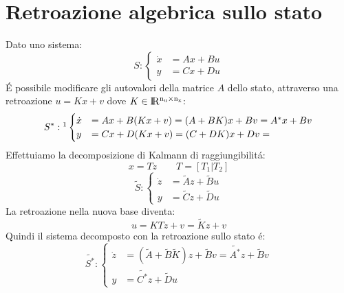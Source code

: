 \documentclass[../main.tex]{subfiles}
\begin{document}
	\section{Retroazione algebrica sullo stato}
		Dato uno sistema:
		\[
			S: 
			\begin{cases}
				\dot x &= Ax + Bu\\
				y &= Cx + Du
			\end{cases}
		\]
		\'E possibile modificare gli autovalori della matrice $ A $ dello stato, attraverso una retroazione $ u = Kx + v $ dove $ K \in \rm I\!R^{n_u \times n_x} $:
		\[
			S^{*}: \footnotemark
			\begin{cases}
				\dot x &= Ax + B(Kx+v) = (A+BK)x + Bv = A^{*}x + Bv\\
				y &= Cx +D(Kx+v) = (C+DK)x + Dv = 
			\end{cases}
		\]
		Effettuiamo la decomposizione di Kalmann di raggiungibilit\'a:
		\[ x = Tz \qquad T = [T_1 | T_2] \]
		\[
			\tilde S:
			\begin{cases}
				\dot z &= \tilde Az + \tilde Bu\\
				y &= \tilde Cz + \tilde Du
			\end{cases}
		\]
		La retroazione nella nuova base diventa:
		\[ u = KTz + v = \tilde Kz + v \]
		Quindi il sistema decomposto con la retroazione sullo stato \'e:
		\[
			\tilde{S^{*}}:
			\begin{cases}
				\dot z &= (\tilde A + \tilde B \tilde K)z + \tilde Bv = \tilde{A^{*}}z + \tilde{B} v\\
				y &= \tilde{C^{*}}z + \tilde Du
			\end{cases}
		\]
\end{document}
